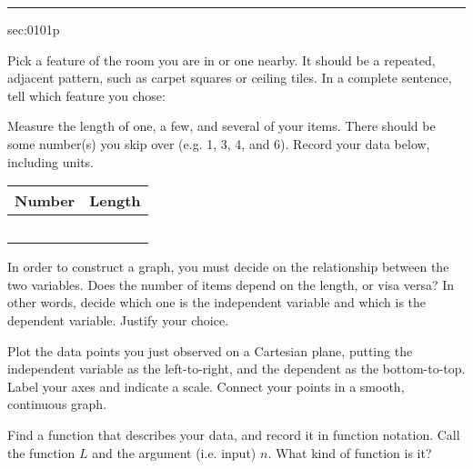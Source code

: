 \renewcommand{\columnseprule}{1.5pt}
\begin{multicols*}{2}
\rule[0.5\baselineskip]{0.4\textwidth}{1pt}
\noindent
{}\label{sec:0101p}
\begin{exercises}{sec:0101p}

\lab{} Pick a feature of the room you are in or one nearby.  It should be a repeated, adjacent pattern,
such as carpet squares or ceiling tiles.  In a complete sentence, tell which feature you chose:

\vspace{2cm}
\lab{} Measure the length of one, a few, and several of your items.  There should be some number(s) you
skip over (e.g. 1, 3, 4, and 6).  Record your data below, including units.

\begin{center}%
\begin{tabular}{ c | p{3cm}  }
  \textbf{Number} & \textbf{Length} \\ 
  \hline \hline 
  &  \\ 
  \hline
  &  \\ 
  \hline
  &  \\ 
  \hline
  &  \\ 
  \hline
  &  \\ 
  \hline
\end{tabular}%
\end{center}%
\lab In order to construct a graph, you must
decide on the relationship between the two variables.  Does the number of items depend on
the length, or visa versa?  In other words, decide which one is the \gls{independent variable} and which
is the \gls{dependent variable}.  Justify your choice.

\vspace{2cm}
\lab{} Plot the data points you just observed on a \gls{Cartesian plane}, putting
the independent variable as the left-to-right, and the dependent as the bottom-to-top.
Label your axes and indicate a scale.
Connect your points in a smooth, continuous graph.

\noindent
{}

\vspace{1cm}

\lab{} Find a \gls{function} that describes your data, and record it in \gls{function notation}.
Call the function $L$ and the argument (i.e. input) $n$.  What kind of function is it?


\end{exercises}
\end{multicols*}
